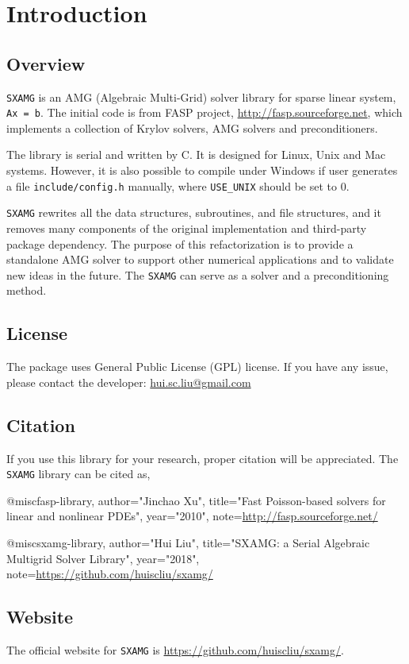 
\chapter{Introduction}

\section{Overview}

\verb|SXAMG| is an AMG (Algebraic Multi-Grid) solver 
library for sparse linear system, \verb|Ax = b|. 
The initial code is from FASP project, \url{http://fasp.sourceforge.net}, which implements a collection of Krylov solvers, AMG solvers and preconditioners.

The library is serial and written by C.
It is designed for Linux, Unix and Mac systems. However, 
it is also possible to compile under Windows if user generates a file \verb|include/config.h| manually,
where \verb|USE_UNIX| should be set to 0. 

\verb|SXAMG| rewrites all the data structures, subroutines, and file structures, and it removes many components of the original implementation and third-party package dependency.
The purpose of this refactorization is to provide a standalone AMG solver to support 
other numerical applications and to validate new ideas in the future. 
The \verb|SXAMG| can serve as a solver and a preconditioning method.

\section{License}

The package uses General Public License (GPL) license. 
If you have any issue, please contact the developer: \href{mailto: hui.sc.liu@gmail.com}{hui.sc.liu@gmail.com}

\section{Citation}

If you use this library for your research, proper citation will be appreciated.
The \verb|SXAMG| library can be cited as,
\begin{evb}
@misc{fasp-library,
    author="Jinchao Xu",
    title="Fast Poisson-based solvers for linear and nonlinear PDEs",
    year="2010",
    note={\url{http://fasp.sourceforge.net/}}
}

@misc{sxamg-library,
    author="Hui Liu",
    title="SXAMG: a Serial Algebraic Multigrid Solver Library",
    year="2018",
    note={\url{https://github.com/huiscliu/sxamg/}}
}
\end{evb}


\section{Website}
The official website for \verb|SXAMG| is \url{https://github.com/huiscliu/sxamg/}.

